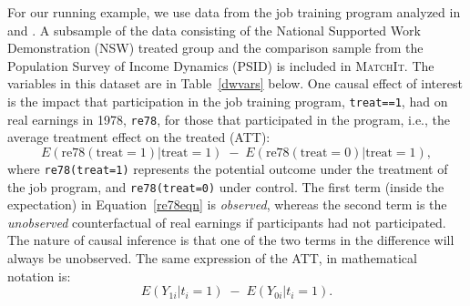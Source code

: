 \documentclass[oneside,letterpaper,titlepage]{article}
\newcommand{\MatchIt}{\textsc{MatchIt}}
\begin{document}
For our running example, we use data from the job training program
analyzed in \citet{lalonde86} and \citet{DehWah99}.  A subsample of
the data consisting of the National Supported Work Demonstration (NSW)
treated group and the comparison sample from the Population Survey of
Income Dynamics (PSID) is included in \MatchIt.  The variables in this
dataset are in Table~\ref{dwvars} below.  One causal effect of
interest is the impact that participation in the job training program,
\texttt{treat==1}, had on real earnings in 1978, \texttt{re78}, for
those that participated in the program, i.e., the average treatment
effect on the treated (ATT):
\begin{equation}\label{re78eqn}
  E(\text{re78}(\text{treat}=1) | \text{treat}=1)\; - \; 
  E(\text{re78}(\text{treat}=0) | \text{treat}=1),
\end{equation}
where \texttt{re78(treat=1)} represents the potential outcome under
the treatment of the job program, and \texttt{re78(treat=0)} under
control.  The first term (inside the expectation) in
Equation~\ref{re78eqn} is \emph{observed}, whereas the second term is
the \emph{unobserved} counterfactual of real earnings if participants
had not participated.  The nature of causal inference is that one of
the two terms in the difference will always be unobserved.  The same
expression of the ATT, in mathematical notation is:
\begin{equation}
  E(Y_{1i} | t_i=1 ) \; - \; E(Y_{0i} | t_i=1).
\end{equation}
\end{document}
